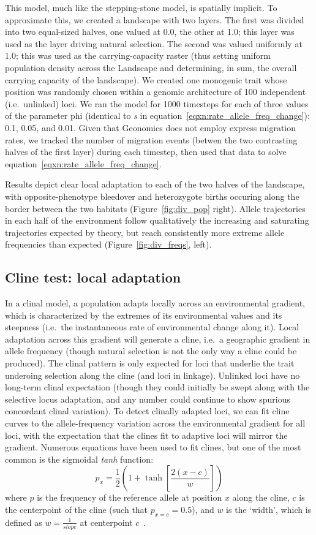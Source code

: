 ﻿\documentclass{article}
\begin{document}
This model, much like the stepping-stone model, is spatially implicit.
To approximate this, we created a landscape with two layers.
The first was divided into two equal-sized halves, one valued at 0.0, the other at 1.0;
this layer was used as the layer driving natural selection.
The second was valued uniformly at 1.0; this was used as the carrying-capacity raster
(thus setting uniform population density across the Landscape and determining,
in sum, the overall carrying capacity of the landscape).
We created one monogenic trait whose position was randomly chosen within a 
genomic architecture of 100 independent (i.e.\ unlinked) loci.
We ran the model for 1000 timesteps for each of three values of the parameter phi
(identical to \emph{s} in equation~\ref{eqxn:rate_allele_freq_change}): 0.1, 0.05, and 0.01.
Given that Geonomics does not employ express migration rates,
we tracked the number of migration events (betwen the two contrasting halves of the first layer)
during each timestep, then used that data to solve equation~\ref{eqxn:rate_allele_freq_change}.

Results depict clear local adaptation to each of the two halves of the landscape,
with opposite-phenotype bleedover and heterozygote births occuring along
the border between the two habitats (Figure~\ref{fig:div_pop} right).
Allele trajectories in each half of the environment follow qualitatively 
the increasing and saturating trajectories expected by theory,
but reach consistently more extreme allele frequencies than expected (Figure~\ref{fig:div_freqs}, left).


\subsection{Cline test: local adaptation}
In a clinal model, a population adapts locally across an environmental gradient,
which is characterized by the extremes of its environmental values and its steepness
(i.e.\ the instantaneous rate of environmental change along it).
Local adaptation across this gradient will generate a cline,
i.e.\ a geographic gradient in allele frequency
(though natural selection is not the only way a cline could be produced).
The clinal pattern is only expected for loci that underlie the trait underoing
selection along the cline (and loci in linkage).
Unlinked loci have no long-term clinal expectation
(though they could initially be swept along with the selective locus adaptation,
and any number could continue to show spurious concordant clinal variation).
To detect clinally adapted loci, we can fit cline curves to the allele-frequency
variation across the environmental gradient for all loci,
with the expectation that the clines fit to adaptive loci will mirror the gradient.
Numerous equations have been used to fit clines, but one of the most common
is the sigmoidal \emph{tanh} function:
\begin{equation}
        p_{x} = \frac{1}{2}(1 + \tanh[\frac{2(x - c)}{w}])
\label{eqxn:cline}
\end{equation}
where $p$ is the frequency of the reference allele at position $x$ along the cline,
$c$ is the centerpoint of the cline (such that $p_{x=c} = 0.5$), and $w$ is the 
`width', which is defined as $w = \frac{1}{slope}$ at centerpoint $c$~\cite{porter}. 
\end{document}
